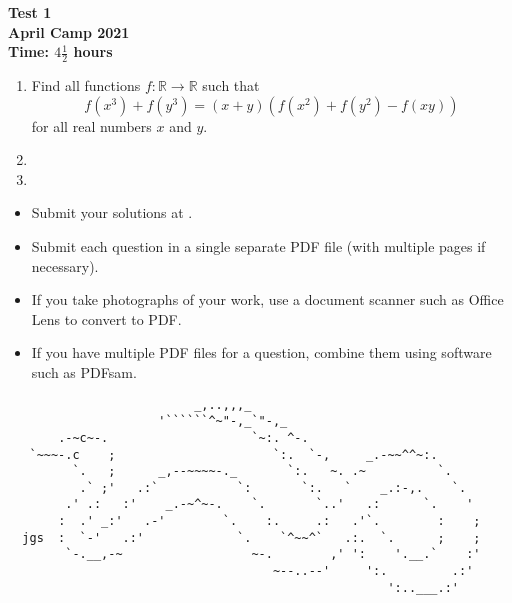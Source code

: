 \documentclass{article}
\begin{document}
\thispagestyle{empty}

\begin{center}
  \textbf{\Large Test 1}
  \\ \vspace{1em}
  \textbf{\large April Camp 2021}
  \\ \vspace{1em}
  \textbf{\large Time: $4\frac{1}{2}$ hours}
\end{center}

\vspace{24pt}

\begin{enumerate}[1.]

\item %
Find all functions $f: \mathbb{R} \to \mathbb{R}$ such that
\[
  f\left( x^3 \right) + f\left( y^3 \right) = (x + y)\left( f\left( x^2 \right) + f\left( y^2 \right) - f(xy) \right)
\]
for all real numbers $x$ and $y$.


\item


\item

\end{enumerate}


\vfill
\begin{itemize}
	\item Submit your solutions at \url{}.
	\item Submit each question in a single separate PDF file (with multiple pages if necessary).
	\item If you take photographs of your work, use a document scanner such as Office Lens to convert to PDF.
	\item If you have multiple PDF files for a question, combine them using software such as PDFsam.
\end{itemize}

\vfill
\centering
\begin{BVerbatim}
                          _,..,,,_
                     '``````^~"-,_`"-,_
       .-~c~-.                    `~:. ^-.
   `~~~-.c    ;                      `:.  `-,     _.-~~^^~:.
         `.   ;      _,--~~~~-._       `:.   ~. .~          `.
          .` ;'   .:`           `:       `:.   `    _.:-,.    `.
        .' .:   :'    _.-~^~-.    `.       `..'   .:      `.    '
       :  .' _:'   .-'        `.    :.     .:   .'`.        :    ;
  jgs  :  `-'   .:'             `.    `^~~^`   .:.  `.      ;    ;
        `-.__,-~                  ~-.        ,' ':    '.__.`    :'
                                     ~--..--'     ':.         .:'
                                                     ':..___.:'
\end{BVerbatim}
\end{document}
